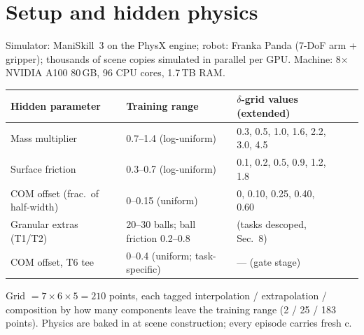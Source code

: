 \documentclass[10pt]{article}
\begin{document}
\section{Setup and hidden physics}
Simulator: ManiSkill~3 on the PhysX engine; robot: Franka Panda (7-DoF arm +
gripper); thousands of scene copies simulated in parallel per GPU.
Machine: 8$\times$ NVIDIA A100 80\,GB, 96 CPU cores, 1.7\,TB RAM.

\begin{center}
\begin{tabular}{@{}lllll@{}}
\toprule
\textbf{Hidden parameter} & \textbf{Training range} & \textbf{$\delta$-grid values (extended)} \\
\midrule
Mass multiplier & 0.7--1.4 (log-uniform) & 0.3, 0.5, 1.0, 1.6, 2.2, 3.0, 4.5 \\
Surface friction & 0.3--0.7 (log-uniform) & 0.1, 0.2, 0.5, 0.9, 1.2, 1.8 \\
COM offset (frac.\ of half-width) & 0--0.15 (uniform) & 0, 0.10, 0.25, 0.40, 0.60 \\
Granular extras (T1/T2) & 20--30 balls; ball friction 0.2--0.8 & (tasks descoped, Sec.~8) \\
COM offset, T6 tee & 0--0.4 (uniform; task-specific) & --- (gate stage) \\
\bottomrule
\end{tabular}
\end{center}
Grid $=7\times6\times5=210$ points, each tagged interpolation / extrapolation /
composition by how many components leave the training range (2 / 25 / 183 points).
Physics are baked in at scene construction; every episode carries fresh c.
\end{document}
